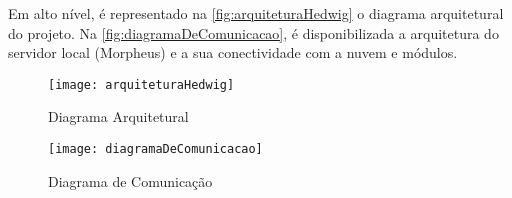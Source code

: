 Em alto nível, é representado na \autoref{fig:arquiteturaHedwig} o diagrama arquitetural do projeto. Na \autoref{fig:diagramaDeComunicacao}, é disponibilizada a arquitetura do servidor local (Morpheus) e a sua conectividade com a nuvem e módulos.

\begin{figure}[htb]
	\caption{\label{fig:arquiteturaHedwig}Diagrama Arquitetural}
	\begin{center}
	    \texttt{[image: arquiteturaHedwig]}
	\end{center}
\end{figure}

\begin{figure}[htb]
	\caption{\label{fig:diagramaDeComunicacao}Diagrama de Comunicação}
	\begin{center}
	    \texttt{[image: diagramaDeComunicacao]}
	\end{center}
\end{figure}


